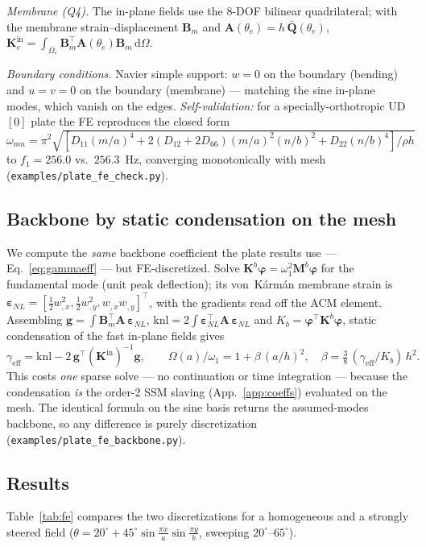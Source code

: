 \documentclass[11pt]{article}
\newcommand{\dd}{\mathrm{d}}
\newcommand{\Om}{\Omega}
\begin{document}
\emph{Membrane (Q4).} The in-plane fields use the 8-DOF bilinear quadrilateral; with the
membrane strain--displacement $\bm B_m$ and $\bm A(\theta_e)=h\,\bar{\bm Q}(\theta_e)$,
$\bm K^{\mathrm{in}}_e=\int_{\Omega_e}\bm B_m^{\!\top}\bm A(\theta_e)\bm B_m\,\dd\Omega$.

\emph{Boundary conditions.} Navier simple support: $w=0$ on the boundary (bending) and
$u=v=0$ on the boundary (membrane) --- matching the sine in-plane modes, which vanish on
the edges. \emph{Self-validation:} for a specially-orthotropic UD $[0]$ plate the FE
reproduces the closed form
$\omega_{mn}=\pi^2\sqrt{[D_{11}(m/a)^4+2(D_{12}{+}2D_{66})(m/a)^2(n/b)^2+D_{22}(n/b)^4]/\rho h}$
to $f_1=256.0$ vs.\ $256.3$~Hz, converging monotonically with mesh
(\texttt{examples/plate\_fe\_check.py}).

\subsection{Backbone by static condensation on the mesh}
We compute the \emph{same} backbone coefficient the plate results use ---
Eq.~\eqref{eq:gammaeff} --- but FE-discretized. Solve $\bm K^b\bm\varphi=\omega_1^2\bm M^b\bm\varphi$
for the fundamental mode (unit peak deflection); its von~K\'arm\'an membrane strain is
$\bm\varepsilon_{NL}=[\tfrac12 w_{,x}^2,\tfrac12 w_{,y}^2,w_{,x}w_{,y}]^{\!\top}$, with the
gradients read off the ACM element. Assembling
$\bm g=\!\int\bm B_m^{\!\top}\bm A\,\bm\varepsilon_{NL}$,
$\mathrm{knl}=2\!\int\bm\varepsilon_{NL}^{\!\top}\bm A\,\bm\varepsilon_{NL}$ and
$K_b=\bm\varphi^{\!\top}\bm K^b\bm\varphi$, static condensation of the fast in-plane fields gives
\begin{equation}
\gamma_{\mathrm{eff}}=\mathrm{knl}-2\,\bm g^{\!\top}(\bm K^{\mathrm{in}})^{-1}\bm g,
\qquad
\Om(a)/\omega_1=1+\beta\,(a/h)^2,\quad \beta=\tfrac38\,(\gamma_{\mathrm{eff}}/K_b)\,h^2 .
\end{equation}
This costs \emph{one} sparse solve --- no continuation or time integration --- because the
condensation \emph{is} the order-2 SSM slaving (App.~\ref{app:coeffs}) evaluated on the mesh.
The identical formula on the sine basis returns the assumed-modes backbone, so any difference
is purely discretization (\texttt{examples/plate\_fe\_backbone.py}).

\subsection{Results}
Table~\ref{tab:fe} compares the two discretizations for a homogeneous and a strongly steered
field ($\theta=20^\circ+45^\circ\sin\tfrac{\pi x}{a}\sin\tfrac{\pi y}{b}$, sweeping
$20^\circ$--$65^\circ$).
\end{document}
